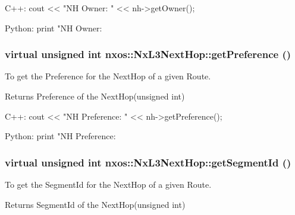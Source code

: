 \begin{DoxyCode}
  C++:
       cout << "NH Owner: " << nh->getOwner();

  Python:
       print "NH Owner: %
\end{DoxyCode}
 \hypertarget{classnxos_1_1NxL3NextHop_a88cebcbe727acec85e772c34b9138b18}{
\subsubsection[{getPreference}]{\setlength{\rightskip}{0pt plus 5cm}virtual unsigned int nxos::NxL3NextHop::getPreference ()}}
\label{classnxos_1_1NxL3NextHop_a88cebcbe727acec85e772c34b9138b18}
To get the Preference for the NextHop of a given Route.

\begin{DoxyReturn}{Returns}
Preference of the NextHop(unsigned int)
\end{DoxyReturn}

\begin{DoxyCode}
  C++:
       cout << "NH Preference: " << nh->getPreference();

  Python:
       print "NH Preference: %
\end{DoxyCode}
 \hypertarget{classnxos_1_1NxL3NextHop_a21b283ed84a9519fab6fef635e6f21d9}{
\subsubsection[{getSegmentId}]{\setlength{\rightskip}{0pt plus 5cm}virtual unsigned int nxos::NxL3NextHop::getSegmentId ()}}
\label{classnxos_1_1NxL3NextHop_a21b283ed84a9519fab6fef635e6f21d9}
To get the SegmentId for the NextHop of a given Route.

\begin{DoxyReturn}{Returns}
SegmentId of the NextHop(unsigned int)
\end{DoxyReturn}

